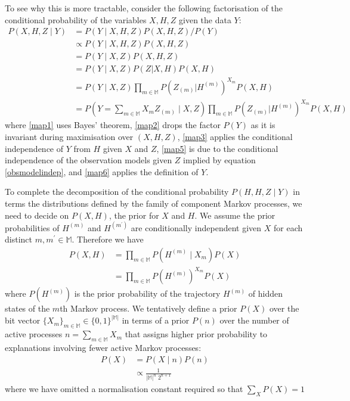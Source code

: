 \documentclass[12pt]{article}
\newcommand{\mm}[0] {\mathbb{M}} %
\newcommand{\traj}[1] {H^{(#1)}}
\newcommand{\eventseq}[1] {Z_{(#1)}}
\begin{document}
To see why this is more tractable, consider the following factorisation of the conditional probability of the variables $X, H, Z$ given the data $Y$:
\begin{align}
P(X, H, Z \mid Y)
& = P(Y \mid X, H, Z) P(X, H, Z) / P(Y) \label{map1} \\
& \propto P(Y \mid X, H, Z) P(X, H, Z) \label{map2} \\
& = P(Y \mid X, Z) P(X, H, Z) \label{map3} \\
& = P(Y \mid X, Z) P(Z | X, H) P(X, H) \label{map4} \\
& = P\left(Y \mid X, Z\right) \prod_{m \in \mm} P\left(\eventseq m | \traj m\right)^{X_m} P(X, H) \label{map5} \\
& = P(Y = \sum_{m \in \mm} X_m \eventseq m \mid X, Z ) \prod_{m \in \mm} P\left(\eventseq m | \traj m\right)^{X_m} P(X, H) \label{map6}
\end{align}
where \ref{map1} uses Bayes' theorem, \ref{map2} drops the factor $P(Y)$ as it is invariant during maximisation over $(X, H, Z)$, \ref{map3} applies the conditional independence of $Y$ from $H$ given $X$ and $Z$, \ref{map5} is due to the conditional independence of the observation models given $Z$ implied by equation \ref{obsmodelindep}, and \ref{map6} applies the definition of $Y$.

To complete the decomposition of the conditional probability $P(H, H, Z \mid Y)$ in terms the distributions defined by the family of component Markov processes, we need to decide on $P(X, H)$, the prior for $X$ and $H$. We assume the prior probabilities of $\traj m$ and $\traj {m^{\prime}}$ are conditionally independent given $X$ for each distinct $m, m^{\prime} \in \mm$. Therefore we have
\begin{align}
P(X, H)
& = \prod_{m \in \mm} P(\traj m \mid X_m ) P(X) \\
& = \prod_{m \in \mm} P(\traj m)^{X_m} P(X)
\end{align}
where $P(\traj m)$ is the prior probability of the trajectory $\traj m$ of hidden states of the $m$th Markov process. We tentatively define a prior $P(X)$ over the bit vector $\{X_m\}_{m \in \mm} \in \{0, 1\}^{|\mm|}$ in terms of a prior $P(n)$ over the number of active processes $n = \sum_{m \in \mm} X_m$ that assigns higher prior probability to explanations involving fewer active Markov processes:
\begin{align}
P(X)
& = P(X \mid n) P(n) \\
& \propto \frac{1}{|\mm|^n \; 2^{n+1}}
\end{align}
where we have omitted a normalisation constant required so that $\sum_{X} P(X) = 1$
\end{document}
